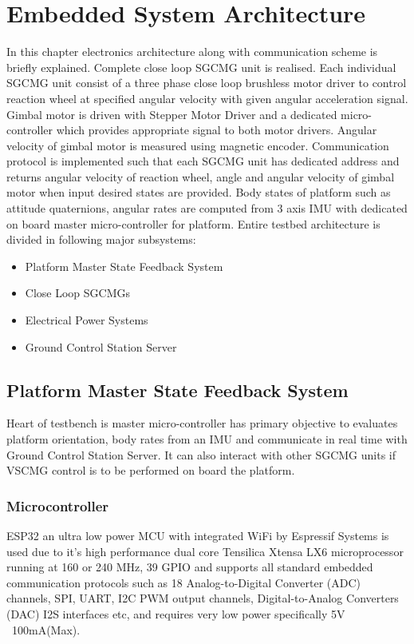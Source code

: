 \chapter{Embedded System Architecture}
\label{chap:8}
In this chapter electronics architecture along with communication scheme is briefly explained. Complete close loop SGCMG unit is realised. Each individual SGCMG unit consist of a three phase close loop brushless motor driver to control reaction wheel at specified angular velocity with given angular acceleration signal. Gimbal motor is driven with Stepper Motor Driver and a dedicated micro-controller which provides appropriate signal to both motor drivers. Angular velocity of gimbal motor is measured using magnetic encoder. Communication protocol is implemented such that each SGCMG unit has dedicated address and returns angular velocity of reaction wheel, angle and angular velocity of gimbal motor when input desired states are provided. Body states of platform such as attitude quaternions, angular rates are computed from 3 axis IMU with dedicated on board master micro-controller for platform. Entire testbed architecture is divided in following major subsystems:
\begin{itemize}
    \item Platform Master State Feedback System
    \item Close Loop SGCMGs
    \item Electrical Power Systems
    \item Ground Control Station Server
\end{itemize}
\section{Platform Master State Feedback System}
Heart of testbench is master micro-controller has primary objective to evaluates platform orientation, body rates from an IMU and communicate in real time with Ground Control Station Server. It can also interact with other SGCMG units if VSCMG control is to be performed on board the platform.
\subsection{Microcontroller}
ESP32 an ultra low power MCU with integrated WiFi by Espressif Systems is used due to it's high performance dual core Tensilica Xtensa LX6 microprocessor running at 160 or 240 MHz, 39 GPIO and supports all standard embedded communication protocols such as 18 Analog-to-Digital Converter (ADC) channels, SPI, UART, I2C PWM output channels, Digital-to-Analog Converters (DAC) I2S interfaces etc, and requires very low power specifically 5V ~100mA(Max). \cite{web:ds_esp32}

